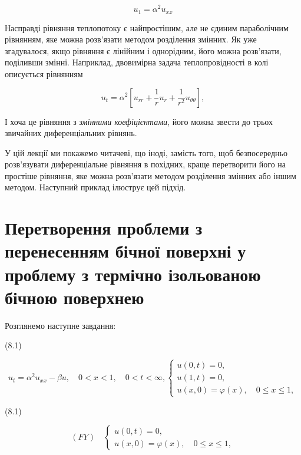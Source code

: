 \documentclass[
  ukrainian,
]{article}
\begin{document}
\[
u_1 = \alpha^2 u_{xx}
\]

Насправді рівняння теплопотоку є найпростішим, але не єдиним
параболічним рівнянням, яке можна розв'язати методом розділення змінних.
Як уже згадувалося, якщо рівняння є лінійним і однорідним, його можна
розв'язати, поділивши змінні. Наприклад, двовимірна задача
теплопровідності в колі описується рівнянням

\[
u_t = \alpha^2 \left[ u_{rr} + \frac{1}{r} u_r + \frac{1}{r^2} u_{\theta\theta} \right],
\]

І хоча це рівняння з \emph{змінними коефіцієнтами}, його можна звести до
трьох звичайних диференціальних рівнянь.

У цій лекції ми покажемо читачеві, що іноді, замість того, щоб
безпосередньо розв'язувати диференціальне рівняння в похідних, краще
перетворити його на простіше рівняння, яке можна розв'язати методом
розділення змінних або іншим методом. Наступний приклад ілюструє цей
підхід.

\section{Перетворення проблеми з перенесенням бічної поверхні у проблему
з термічно ізольованою бічною
поверхнею}\label{ux43fux435ux440ux435ux442ux432ux43eux440ux435ux43dux43dux44f-ux43fux440ux43eux431ux43bux435ux43cux438-ux437-ux43fux435ux440ux435ux43dux435ux441ux435ux43dux43dux44fux43c-ux431ux456ux447ux43dux43eux457-ux43fux43eux432ux435ux440ux445ux43dux456-ux443-ux43fux440ux43eux431ux43bux435ux43cux443-ux437-ux442ux435ux440ux43cux456ux447ux43dux43e-ux456ux437ux43eux43bux44cux43eux432ux430ux43dux43eux44e-ux431ux456ux447ux43dux43eux44e-ux43fux43eux432ux435ux440ux445ux43dux435ux44e}

Розглянемо наступне завдання:

(8.1)

\[
u_{t} = \alpha^{2}u_{xx} - \beta u, \quad 0 < x < 1, \quad 0 < t < \infty,
\begin{cases} u(0, t) = 0, \\ u(1, t) = 0, \\ u(x, 0) = \varphi(x), \quad 0 \le x \le 1, \end{cases}
\]

(8.1)

\[
(FY) \quad \begin{cases} u(0, t) = 0, \\ u(x, 0) = \varphi(x), \quad 0 \le x \le 1, \end{cases}
\]
\end{document}
